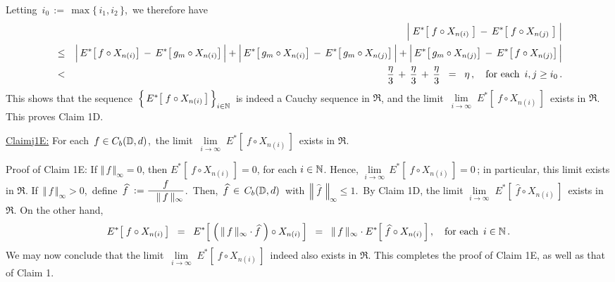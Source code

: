 Letting \,$i_{0} \,:=\, \max\{\,i_{1},i_{2}\,\}$,\, we therefore have
\begin{eqnarray*}
&&
	\left\vert\; \overset{{\color{white}.}}{E^{*}}\!\left[\;f \circ X_{n(i)}\;\right] \,-\, E^{*}\!\left[\;f \circ X_{n(j)}\;\right] \;\right\vert
\\
&\leq&
	\left\vert\, \overset{{\color{white}.}}{E^{*}}\!\left[\,f \circ X_{n(i)}\right] \,-\, E^{*}\!\left[\,g_{m} \circ X_{n(i)}\right] \,\right\vert
	+
	\left\vert\, \overset{{\color{white}.}}{E^{*}}\!\left[\,g_{m} \circ X_{n(i)}\right] \,-\, E^{*}\!\left[\,g_{m} \circ X_{n(j)}\right] \,\right\vert
	+
	\left\vert\, \overset{{\color{white}.}}{E^{*}}\!\left[\,g_{m} \circ X_{n(j)}\right] \,-\, E^{*}\!\left[\,f \circ X_{n(j)}\right] \,\right\vert
\\
& < &
	\dfrac{\eta}{3} \,+\, \dfrac{\eta}{3} \,+\, \dfrac{\eta}{3}
\;\; = \;\;
	\eta\,,
\quad
\textnormal{for each \,$i,j \geq i_{0}$}\,.
\end{eqnarray*}
This shows that the sequence
\,$\left\{\,\overset{{\color{white}.}}{E^{*}}\!\left[\;f \circ X_{n(i)}\,\right]\,\right\}_{i\in\N}$\,
is indeed a Cauchy sequence in $\Re$, and
the limit \,$\underset{i\rightarrow\infty}{\lim}\; E^{*}\!\left[\;f \circ X_{n(i)}\,\right]$\, exists in $\Re$.
This proves Claim 1D.


\vskip 0.8cm
\begin{center}\begin{minipage}{6.5in}
\underline{Claim{{\color{white}j}}1E:}\;\;
For each \,$f \in C_{b}(\mathbb{D},d)$,\,
the limit \,$\underset{i\rightarrow\infty}{\lim}\; E^{*}\!\left[\;f \circ X_{n(i)}\,\right]$\, exists in $\Re$.
\end{minipage}\end{center}
Proof of Claim 1E:\;\;
If $\Vert\,f\,\Vert_{\infty} = 0$, then $E^{*}\!\left[\;f \circ X_{n(i)}\,\right] = 0$, for each $i\in\mathbb{N}$.
Hence, $\underset{i\rightarrow\infty}{\lim}\, E^{*}\!\left[\;f \circ X_{n(i)}\,\right] = 0$\,;
in particular, this limit exists in $\Re$.
If \,$\Vert\,f\,\Vert_{\infty} > 0$,\, define \,$\widehat{f} \; := \dfrac{f}{{\color{white}2.}\Vert\,f\,\Vert_{\infty}}$.\,
Then, \,$\widehat{f} \,\in\, C_{b}(\mathbb{D},d)$\, with \,$\left\Vert\;\widehat{f}\;\,\right\Vert_{\infty} \leq 1$.\,
By Claim 1D, the limit
$\underset{i\rightarrow\infty}{\lim}\; E^{*}\!\left[\;\widehat{f} \circ X_{n(i)}\,\right]$\, exists in $\Re$.
On the other hand,
\begin{equation*}
E^{*}\!\left[\;f \circ X_{n(i)}\,\right]
\;\; = \;\;
	E^{*}\!\left[\; \left(\,\Vert\,f\,\Vert_{\infty} \cdot \widehat{f}\;\right) \circ X_{n(i)}\,\right]
\;\; = \;\;
	\Vert\,f\,\Vert_{\infty} \cdot E^{*}\!\left[\; \widehat{f} \circ X_{n(i)}\,\right],
\quad
\textnormal{for each \,$i \in \mathbb{N}$}\,.
\end{equation*}
We may now conclude that the limit
\,$\underset{i\rightarrow\infty}{\lim}\; E^{*}\!\left[\;f \circ X_{n(i)}\,\right]$\, indeed also exists in $\Re$.
This completes the proof of Claim 1E, as well as that of Claim 1.

